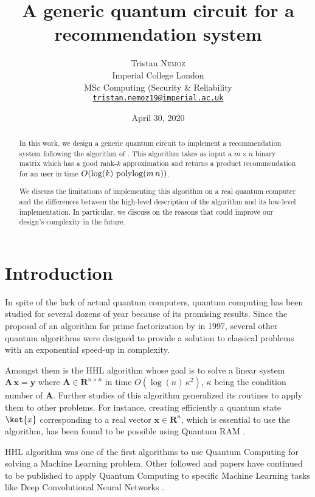 \documentclass[11pt, a4paper]{article}
\date{April 30, 2020}
\author{Tristan \textsc{Nemoz}\\Imperial College London\\MSc Computing (Security \& Reliability\\\href{mailto:tristan.nemoz19@imperial.ac.uk}{\texttt{tristan.nemoz19@imperial.ac.uk}}}
\title{A generic quantum circuit for a recommendation system}
\begin{document}
	
	\maketitle
    \begin{abstract}
        In this work, we design a generic quantum circuit to implement a recommendation system following the algorithm of \citeauthor{QRS}. This algorithm takes as input a \(m\times n\) binary matrix which has a good rank-\(k\) approximation and returns a product recommendation for an user in time \(O(\log(k)\,\operatorname{polylog}(m\,n))\).
        
        We discuss the limitations of implementing this algorithm on a real quantum computer and the differences between the high-level description of the algorithm and its low-level implementation. In particular, we discuss on the reasons that could improve our design's complexity in the future.
    \end{abstract}
    
    \section{Introduction}
        In spite of the lack of actual quantum computers, quantum computing has been studied for several dozens of year because of its promising results. Since the proposal of an algorithm for prime factorization \cite{Shor} by \citeauthor{Shor} in 1997, several other quantum algorithms were designed to provide a solution to classical problems with an exponential speed-up in complexity.
        
        Amongst them is the HHL algorithm \cite{HHL} whose goal is to solve a linear system \(\mathbf{A}\,\mathbf{x}=\mathbf{y}\) where \(\mathbf{A}\in\mathbf{R}^{n\times n}\) in time \(O\left(\log(n)\,\kappa^2\right)\), \(\kappa\) being the condition number of \(\mathbf{A}\). Further studies of this algorithm generalized its routines to apply them to other problems. For instance, creating efficiently a quantum state \(\ket{x}\) corresponding to a real vector \(\mathbf{x}\in\mathbf{R}^n\), which is essential to use the algorithm, has been found to be possible using Quantum RAM \cite{Prakash, QRAM, QRAMCircuit}.
        
        HHL algorithm was one of the first algorithms to use Quantum Computing for solving a Machine Learning problem. Other followed and papers have continued to be published to apply Quantum Computing to specific Machine Learning tasks like Deep Convolutional Neural Networks \cite{QCNN}.
        
\end{document}
